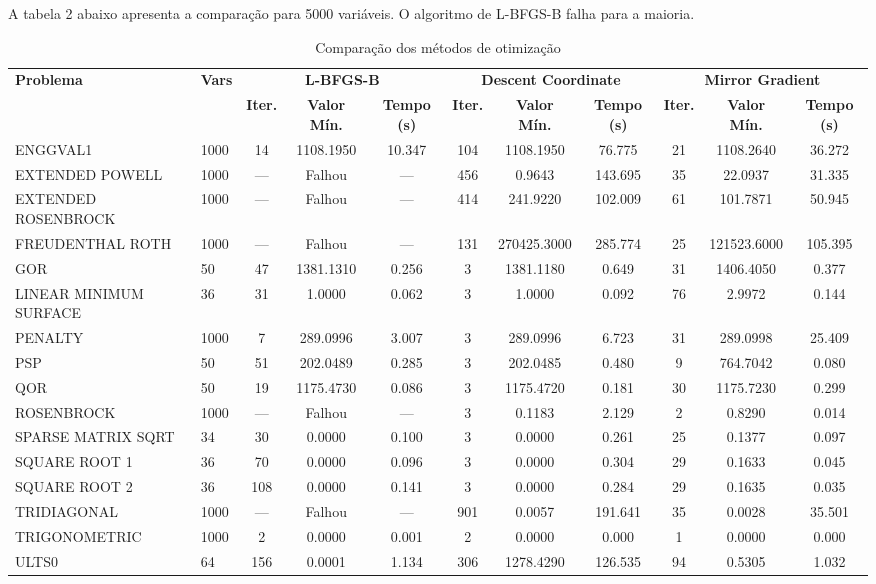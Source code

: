 \documentclass[12pt,a4paper]{article}
\begin{document}
\begin{landscape}
A tabela 2 abaixo apresenta a comparação para 5000 variáveis. O algoritmo de L-BFGS-B falha para a maioria.

\begin{table}[h!]
\centering
\caption{Comparação dos métodos de otimização}
\label{tab:comparacao}
\footnotesize
\begin{tabular}{@{}ll|ccc|ccc|ccc@{}}
\toprule
\multirow{2}{*}{\textbf{Problema}} & \multirow{2}{*}{\textbf{Vars}} & \multicolumn{3}{c|}{\textbf{L-BFGS-B}} & \multicolumn{3}{c|}{\textbf{Descent Coordinate}} & \multicolumn{3}{c}{\textbf{Mirror Gradient}} \\
\cmidrule(lr){3-5} \cmidrule(lr){6-8} \cmidrule(lr){9-11}
& & \textbf{Iter.} & \textbf{Valor Mín.} & \textbf{Tempo (s)} & \textbf{Iter.} & \textbf{Valor Mín.} & \textbf{Tempo (s)} & \textbf{Iter.} & \textbf{Valor Mín.} & \textbf{Tempo (s)} \\
\midrule
ENGGVAL1 & 1000 & 14 & 1108.1950 & 10.347 & 104 & 1108.1950 & 76.775 & 21 & 1108.2640 & 36.272 \\
EXTENDED POWELL & 1000 & --- & Falhou & --- & 456 & 0.9643 & 143.695 & 35 & 22.0937 & 31.335 \\
EXTENDED ROSENBROCK & 1000 & --- & Falhou & --- & 414 & 241.9220 & 102.009 & 61 & 101.7871 & 50.945 \\
FREUDENTHAL ROTH & 1000 & --- & Falhou & --- & 131 & 270425.3000 & 285.774 & 25 & 121523.6000 & 105.395 \\
GOR & 50 & 47 & 1381.1310 & 0.256 & 3 & 1381.1180 & 0.649 & 31 & 1406.4050 & 0.377 \\
LINEAR MINIMUM SURFACE & 36 & 31 & 1.0000 & 0.062 & 3 & 1.0000 & 0.092 & 76 & 2.9972 & 0.144 \\
PENALTY & 1000 & 7 & 289.0996 & 3.007 & 3 & 289.0996 & 6.723 & 31 & 289.0998 & 25.409 \\
PSP & 50 & 51 & 202.0489 & 0.285 & 3 & 202.0485 & 0.480 & 9 & 764.7042 & 0.080 \\
QOR & 50 & 19 & 1175.4730 & 0.086 & 3 & 1175.4720 & 0.181 & 30 & 1175.7230 & 0.299 \\
ROSENBROCK & 1000 & --- & Falhou & --- & 3 & 0.1183 & 2.129 & 2 & 0.8290 & 0.014 \\
SPARSE MATRIX SQRT & 34 & 30 & 0.0000 & 0.100 & 3 & 0.0000 & 0.261 & 25 & 0.1377 & 0.097 \\
SQUARE ROOT 1 & 36 & 70 & 0.0000 & 0.096 & 3 & 0.0000 & 0.304 & 29 & 0.1633 & 0.045 \\
SQUARE ROOT 2 & 36 & 108 & 0.0000 & 0.141 & 3 & 0.0000 & 0.284 & 29 & 0.1635 & 0.035 \\
TRIDIAGONAL & 1000 & --- & Falhou & --- & 901 & 0.0057 & 191.641 & 35 & 0.0028 & 35.501 \\
TRIGONOMETRIC & 1000 & 2 & 0.0000 & 0.001 & 2 & 0.0000 & 0.000 & 1 & 0.0000 & 0.000 \\
ULTS0 & 64 & 156 & 0.0001 & 1.134 & 306 & 1278.4290 & 126.535 & 94 & 0.5305 & 1.032 \\

\bottomrule
\end{tabular}
\end{table}


\end{landscape}
\end{document}
